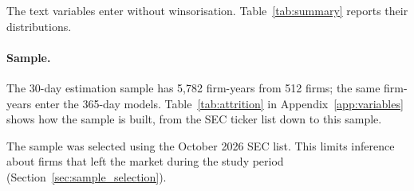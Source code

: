 The text variables enter without winsorisation. Table~\ref{tab:summary} 
reports their distributions.

\paragraph{Sample.} The 30-day estimation sample has 5{,}782 firm-years from
512 firms; the same firm-years enter the 365-day models.
Table~\ref{tab:attrition} in Appendix~\ref{app:variables} shows how the sample
is built, from the SEC ticker list down to this sample.

The sample was selected using the October 2026 SEC list. 
This limits inference about firms that left the market during the study period 
(Section~\ref{sec:sample_selection}).
